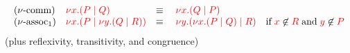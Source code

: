 \begin{definition}\label{def:cp-equiv}
  \[
    \begin{array}{llll}
      (\nu\text{-comm})
      & \textcolor{red}{\nu x.(P \mid Q)}
      & \equiv \;
      & \textcolor{red}{\nu x.(Q \mid P)}
      \\
      (\nu\text{-assoc}_{1})
      & \textcolor{red}{\nu x.(P \mid \nu y.(Q \mid R))}
      & \equiv \;
      & \textcolor{red}{\nu y.(\nu x.(P \mid Q) \mid R)}
        \quad \text{if} \; \textcolor{red}{x}\not\in\textcolor{red}{R} \; \text{and} \; \textcolor{red}{y}\not\in\textcolor{red}{P}
    \end{array}
  \]
  (plus reflexivity, transitivity, and congruence)
\end{definition}
